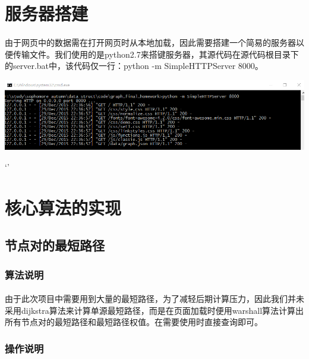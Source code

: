 \documentclass{article}
\begin{document}
\begin{CJK}{UTF8}{gkai}
\section{服务器搭建} %
	\paragraph{}
	由于网页中的数据需在打开网页时从本地加载，因此需要搭建一个简易的服务器以便传输文件。我们使用的是python2.7来搭键服务器，其源代码在源代码根目录下的server.bat中，该代码仅一行：python -m SimpleHTTPServer 8000。
	\\[\intextsep] 
	\begin{minipage}{\textwidth} 
	    \centering 
	    \includegraphics[width=0.9\linewidth]{server.PNG}
	\end{minipage} `'
	\\[\intextsep] 

\section{核心算法的实现} %
	\subsection{节点对的最短路径}
		\subsubsection{算法说明} %
			\paragraph{}
			由于此次项目中需要用到大量的最短路径，为了减轻后期计算压力，因此我们并未采用dijkstra算法来计算单源最短路径，而是在页面加载时便用warshall算法计算出所有节点对的最短路径和最短路径权值。在需要使用时直接查询即可。
		\subsubsection{操作说明}

\end{CJK}
\end{document}

